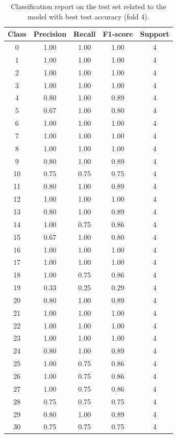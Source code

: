 \documentclass{article}
\begin{document}
\begin{sloppy}
\begin{table}[ht]
  \centering
  \caption{Classification report on the test set related to the model with best test accuracy (fold 4).}
  \label{tab:test_report}
  \begin{tabular}{|c|c|c|c|c|}
  \hline
  Class & Precision & Recall & F1-score & Support \\
  \hline
  0  & 1.00 & 1.00 & 1.00 & 4 \\
  1  & 1.00 & 1.00 & 1.00 & 4 \\
  2  & 1.00 & 1.00 & 1.00 & 4 \\
  3  & 1.00 & 1.00 & 1.00 & 4 \\
  4  & 0.80 & 1.00 & 0.89 & 4 \\
  5  & 0.67 & 1.00 & 0.80 & 4 \\
  6  & 1.00 & 1.00 & 1.00 & 4 \\
  7  & 1.00 & 1.00 & 1.00 & 4 \\
  8  & 1.00 & 1.00 & 1.00 & 4 \\
  9  & 0.80 & 1.00 & 0.89 & 4 \\
  10 & 0.75 & 0.75 & 0.75 & 4 \\
  11 & 0.80 & 1.00 & 0.89 & 4 \\
  12 & 1.00 & 1.00 & 1.00 & 4 \\
  13 & 0.80 & 1.00 & 0.89 & 4 \\
  14 & 1.00 & 0.75 & 0.86 & 4 \\
  15 & 0.67 & 1.00 & 0.80 & 4 \\
  16 & 1.00 & 1.00 & 1.00 & 4 \\
  17 & 1.00 & 1.00 & 1.00 & 4 \\
  18 & 1.00 & 0.75 & 0.86 & 4 \\
  19 & 0.33 & 0.25 & 0.29 & 4 \\
  20 & 0.80 & 1.00 & 0.89 & 4 \\
  21 & 1.00 & 1.00 & 1.00 & 4 \\
  22 & 1.00 & 1.00 & 1.00 & 4 \\
  23 & 1.00 & 1.00 & 1.00 & 4 \\
  24 & 0.80 & 1.00 & 0.89 & 4 \\
  25 & 1.00 & 0.75 & 0.86 & 4 \\
  26 & 1.00 & 0.75 & 0.86 & 4 \\
  27 & 1.00 & 0.75 & 0.86 & 4 \\
  28 & 0.75 & 0.75 & 0.75 & 4 \\
  29 & 0.80 & 1.00 & 0.89 & 4 \\
  30 & 0.75 & 0.75 & 0.75 & 4 \\

\end{tabular}
\end{table}
\end{sloppy}
\end{document}
